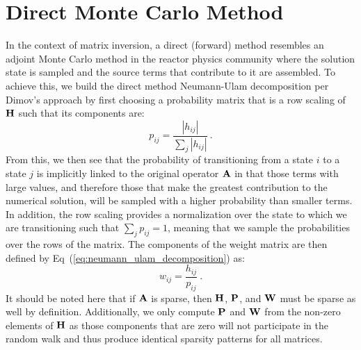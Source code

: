 \section{Direct Monte Carlo Method}
\label{sec:direct_mc}
In the context of matrix inversion, a direct (forward) method resembles an
adjoint Monte Carlo method in the reactor physics community where the
solution state is sampled and the source terms that contribute to it
are assembled. To achieve this, we build the direct method
Neumann-Ulam decomposition per Dimov's approach by first choosing a
probability matrix that is a row scaling of $\mathbf{H}$ such that its
components are:
\begin{equation}
  p_{ij} = \frac{|h_{ij}|}{\sum_j |h_{ij}|}\:.
  \label{eq:direct_probability}
\end{equation}
From this, we then see that the probability of transitioning from a
state $i$ to a state $j$ is implicitly linked to the original operator
$\mathbf{A}$ in that those terms with large values, and therefore those
that make the greatest contribution to the numerical solution, will be
sampled with a higher probability than smaller terms. In addition, the
row scaling provides a normalization over the state to which we are
transitioning such that $\sum_j p_{ij} = 1$, meaning that we sample
the probabilities over the rows of the matrix. The components of
the weight matrix are then defined by
Eq~(\ref{eq:neumann_ulam_decomposition}) as:
\begin{equation}
  w_{ij} = \frac{h_{ij}}{p_{ij}}\:.
  \label{eq:direct_weight}
\end{equation}
It should be noted here that if $\mathbf{A}$ is sparse, then $\mathbf{H}$,
$\mathbf{P}$, and $\mathbf{W}$ must be sparse as well by
definition. Additionally, we only compute $\mathbf{P}$ and $\mathbf{W}$ from
the non-zero elements of $\mathbf{H}$ as those components that are zero
will not participate in the random walk and thus produce identical
sparsity patterns for all matrices.

